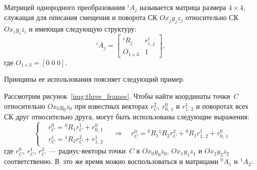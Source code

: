 \label{app_ht_matrices}
Матрицей однородного преобразования ${}^{i}A_j$ называется матрица размера $4 \times 4$, служащая для описания смещения и поворота СК $Ox_{j}y_{j}z_{j}$ относительно СК $Ox_{i}y_{i}z_{i}$ и имеющая следующую структуру:
\begin{equation}
    {}^{i}A_j =
    \begin{bmatrix}
        {}^{i}R_j & r^{i}_{i,\,j}\\
        O_{1 \times 3} & 1
    \end{bmatrix}\!\!,
\end{equation}
где $O_{1 \times 3} = [0\;0\;0]$.

Принципы ее использования поясняет следующий пример.

Рассмотрим рисунок~\ref{img:three_frames}.
Чтобы найти координаты точки~$C$ относительно $Ox_0y_0z_0$ при известных векторах $r^2_C$, $r^{0}_{0,\,1}$ и $r^{1}_{1,\,2}$ и поворотах всех СК друг относительно друга,  могут быть использованы следующие выражения:
\begin{equation}
	\left\{
	\begin{aligned}
		\!&r^0_C = {}^{0}R_1 r^1_C + r^{0}_{0,\,1}\\
		\!&r^1_C = {}^{1}R_2 r^2_C + r^{1}_{1,\,2}
	\end{aligned}
	\right.
	\quad \Rightarrow \quad
	r^0_C = {}^{0}R_1{}^{1}R_2 r^2_C + {}^{0}R_1 r^{1}_{1,\,2} + r^{0}_{0,\,1}
\end{equation}
где $r^0_C$, $r^1_C$, $r^2_C$~--- радиус-векторы точки~$C$ в $Ox_0y_0z_0$, $Ox_1y_1z_1$ и $Ox_2y_2z_2$ соответственно.
В~это же время можно воспользоваться и матрицами ${}^{0}A_1$ и ${}^{1}A_2$:

